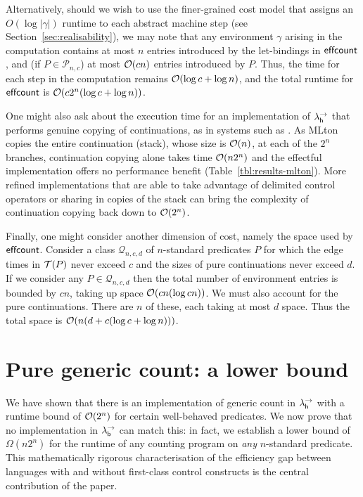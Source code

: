 \documentclass[12pt,phd,lfcs,twoside,openright,logo,leftchapter,normalheadings]{infthesis}
\theoremstyle{plain}
\theoremstyle{definition}
\begin{document}
Alternatively, should we wish to use the finer-grained cost model that
assigns an $O(\log |\gamma|)$ runtime to each abstract machine step
(see Section~\ref{sec:realisability}), we may note that any
environment $\gamma$ arising in the computation contains at most $n$
entries introduced by the let-bindings in $\mathsf{effcount}$, and (if $P \in
\mathcal{P}_{n,c}$) at most $\mathcal{O}(cn)$ entries introduced by $P$.
Thus, the time for each step in the computation remains $\mathcal{O}(\log c
+ \log n)$, and the total runtime for $\mathsf{effcount}$ is $\mathcal{O}(c 2^n (\log
c + \log n))$.

One might also ask about the execution time for an implementation of
$\lambda^\rightarrow_{\mathsf{h}}$ that performs genuine copying of continuations, as in systems
such as \citet{mlton}.
%
As MLton copies the entire continuation (stack), whose size is
$\mathcal{O}(n)$, at each of the $2^n$ branches, continuation copying alone
takes time $\mathcal{O}(n2^n)$ and the effectful implementation offers no
performance benefit (Table~\ref{tbl:results-mlton}).
%
More refined implementations \citep{FarvardinR20, FlattD20} that are
able to take advantage of delimited control operators or sharing in
copies of the stack can bring the complexity of continuation copying
back down to $\mathcal{O}(2^n)$.

Finally, one might consider another dimension of cost, namely the
space used by $\mathsf{effcount}$.
%
Consider a class $\mathcal{Q}_{n,c,d}$ of $n$-standard predicates $P$
for which the edge times in $\mathcal{T}(P)$ never exceed $c$ and the sizes of
pure continuations never exceed $d$.
%
If we consider any $P \in \mathcal{Q}_{n,c,d}$ then the total number
of environment entries is bounded by $cn$, taking up space
$\mathcal{O}(cn(\log cn))$.
%
We must also account for the pure continuations. There are $n$ of
these, each taking at most $d$ space.
%
Thus the total space is $\mathcal{O}(n(d + c(\log c + \log n)))$.

\section{Pure generic count: a lower bound}
\label{sec:pure-counting}

\newcommand{\naivecount}{\dec{naivecount}}
\newcommand{\lazycount}{\dec{lazycount}}
\newcommand{\BergerCount}{\dec{BergerCount}}
\newcommand{\bestshot}{\dec{bestshot}}
\newcommand{\FF}{\mathcal{F}}
\newcommand{\GG}{\mathcal{G}}

We have shown that there is an implementation of generic count in
$\lambda^\rightarrow_{\mathsf{h}}$ with a runtime bound of $\mathcal{O}(2^n)$ for certain well-behaved
predicates. We now prove that no implementation in $\lambda^\rightarrow_{\mathsf{b}}$ can match
this: in fact, we establish a lower bound of $\Omega(n2^n)$ for the
runtime of any counting program on \emph{any} $n$-standard predicate.
This mathematically rigorous characterisation of the efficiency gap
between languages with and without first-class control constructs is
the central contribution of the paper.
\end{document}
